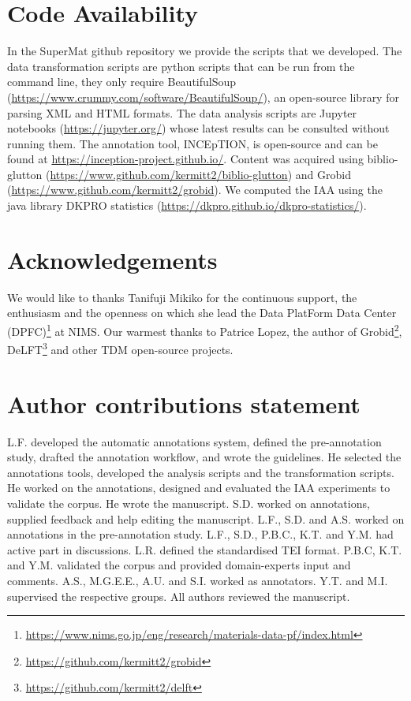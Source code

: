 \documentclass[fleqn,10pt]{wlscirep}
\begin{document}
\label{sec:code-availability}
\section*{Code Availability}
In the SuperMat github repository we provide the scripts that we developed. The data transformation scripts are python scripts that can be run from the command line, they only require BeautifulSoup (\url{https://www.crummy.com/software/BeautifulSoup/}), an open-source library for parsing XML and HTML formats. The data analysis scripts are Jupyter notebooks (\url{https://jupyter.org/}) whose latest results can be consulted without running them. 
The annotation tool, INCEpTION, is open-source and can be found at \url{https://inception-project.github.io/}. 
Content was acquired using biblio-glutton (\url{https://www.github.com/kermitt2/biblio-glutton}) and Grobid (\url{https://www.github.com/kermitt2/grobid}).
We computed the IAA using the java library DKPRO statistics (\url{https://dkpro.github.io/dkpro-statistics/}).  

  

\section*{Acknowledgements}

We would like to thanks Tanifuji Mikiko for the continuous support, the enthusiasm and the openness on which she lead the Data PlatForm Data Center (DPFC)\footnote{\url{https://www.nims.go.jp/eng/research/materials-data-pf/index.html}} at NIMS.
Our warmest thanks to Patrice Lopez, the author of Grobid\footnote{\url{https://github.com/kermitt2/grobid}}, DeLFT\footnote{\url{https://github.com/kermitt2/delft}} and other TDM open-source projects. 

\section*{Author contributions statement}

L.F. developed the automatic annotations system, defined the pre-annotation study, drafted the annotation workflow, and wrote the guidelines. 
He selected the annotations tools, developed the analysis scripts and the transformation scripts. 
He worked on the annotations, designed and evaluated the IAA experiments to validate the corpus. 
He wrote the manuscript.
S.D. worked on annotations, supplied feedback and help editing the manuscript.
L.F., S.D. and A.S. worked on annotations in the pre-annotation study. 
L.F., S.D., P.B.C., K.T. and Y.M. had active part in discussions.
L.R. defined the standardised TEI format.
P.B.C, K.T. and Y.M. validated the corpus and provided domain-experts input and comments.
A.S., M.G.E.E., A.U. and S.I. worked as annotators. 
Y.T. and M.I. supervised the respective groups. 
All authors reviewed the manuscript. 
\end{document}

